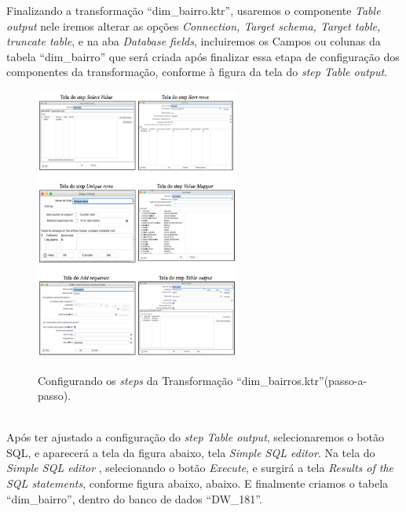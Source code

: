 Finalizando a transforma\c{c}\~{a}o ``dim\_bairro.ktr'', usaremos o componente \textit{Table output} nele iremos alterar as op\c{c}\~{o}es \textit{Connection, Target schema, Target table, truncate table}, e na aba \textit{Database fields}, incluiremos os Campos ou colunas da tabela ``dim\_bairro'' que ser\'{a} criada ap\'os finalizar essa etapa de configura\c{c}\~{a}o dos componentes da transforma\c{c}\~{a}o, conforme \`{a} figura da tela do \textit{step Table output}.

\begin{figure}[H]
	\vspace*{0,2cm}
    \centering
    \caption{Configurando os \textit{steps} da Transforma\c{c}\~{a}o ``dim\_bairros.ktr''(passo-a-passo).}
    \includegraphics[width=0.6\textwidth]{./04-figuras/figura-passos-dim-bairros}
    \label{fig:ilustfigpassasdimbairros}
\end{figure}
\vspace*{-0,9cm}
{\raggedright {}} \\

Ap\'os ter ajustado a configura\c{c}\~{a}o do \textit{step Table output}, selecionaremos o bot\~{a}o SQL, e aparecer\'{a} a tela da figura abaixo, tela \textit{Simple SQL editor}. Na tela do \textit{Simple SQL editor} , selecionando o bot\~{a}o \textit{Execute}, e surgir\'{a} a tela \textit{Results of the SQL statements}, conforme figura abaixo, abaixo. E finalmente criamos o tabela ``dim\_bairro'', dentro do banco de dados 
``DW\_181''.


